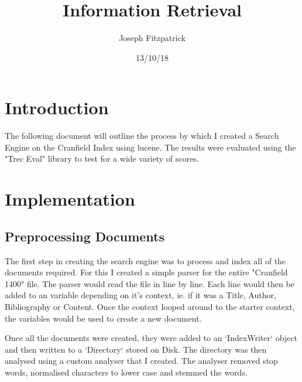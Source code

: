\documentclass{article}
\author{Joseph Fitzpatrick}
\title{Information Retrieval}
\date{13/10/18}
\begin{document}
  
\maketitle
\section{Introduction}
  The following document will outline the process by which I created a Search Engine on the Cranfield Index using lucene.
  The results were evaluated using the "Trec Eval" library to test for a wide variety of scores.

\section{Implementation}
\subsection{Preprocessing Documents}
 
  The first step in creating the search engine was to process and index all of the documents required. For this I created a simple parser for the entire "Cranfield 1400" file. The parser would read the file in line by line. Each line would then be added to an variable  depending on it's context, ie. if it was a Title, Author, Bibliography or Content. Once the context looped around to the starter context, the variables would be used to create a new document. \par
  Once all the documents were created, they were added to an `IndexWriter` object and then written to a `Directory` stored on Disk. The directory was then analysed using a custom analyser that I created. The analyser removed stop words, normalised characters to lower case and stemmed the words.
  
\end{document}
